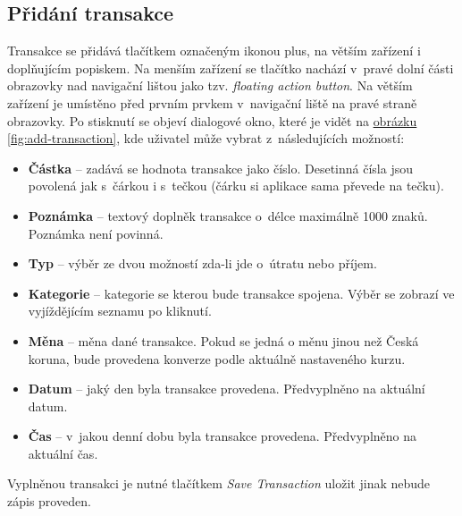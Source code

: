 \documentclass[
  biblatex,
  figures=true,
  tables=false,
  glossaries,
  index
]{kidiplom}
\begin{document}
\subsection{Přidání transakce}
Transakce se přidává tlačítkem označeným ikonou plus, na větším zařízení i doplňujícím popiskem. Na menším zařízení se tlačítko nachází v~pravé dolní části obrazovky nad navigační lištou jako tzv. \textit{floating action button}. Na větším zařízení je umístěno před prvním prvkem v~navigační liště na pravé straně obrazovky. Po stisknutí se objeví dialogové okno, které je vidět na \hyperref[fig:add-transaction]{obrázku \ref{fig:add-transaction}}, kde uživatel může vybrat z~následujících možností:
\begin{itemize}
  \item \textbf{Částka} -- zadává se hodnota transakce jako číslo. Desetinná čísla jsou povolená jak s~čárkou i s~tečkou (čárku si aplikace sama převede na tečku).
  \item \textbf{Poznámka} -- textový doplněk transakce o~délce maximálně 1000 znaků.  Poznámka není povinná.
  \item \textbf{Typ} -- výběr ze dvou možností zda-li jde o~útratu nebo příjem.
  \item \textbf{Kategorie} -- kategorie se kterou bude transakce spojena. Výběr se zobrazí ve vyjíždějícím seznamu po kliknutí.
  \item \textbf{Měna} -- měna dané transakce. Pokud se jedná o měnu jinou než Česká koruna, bude provedena konverze podle aktuálně nastaveného kurzu.
  \item \textbf{Datum} -- jaký den byla transakce provedena. Předvyplněno na aktuální datum.
  \item \textbf{Čas} -- v~jakou denní dobu byla transakce provedena. Předvyplněno na aktuální čas.
\end{itemize}
Vyplněnou transakci je nutné tlačítkem \textit{Save Transaction} uložit jinak nebude zápis proveden.
\end{document}
